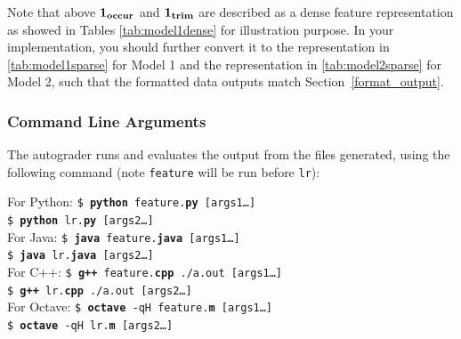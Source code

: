 \documentclass[11pt]{exam}
\numberwithin{equation}{section} %
\numberwithin{figure}{section} %
\numberwithin{table}{section} %
\begin{document}
Note that above $\bf{1}_{occur}$ and $\bf{1}_{trim}$ are described as a dense feature representation as showed in Tables \ref{tab:model1dense} for illustration purpose. In your implementation, you should further convert it to the representation in \ref{tab:model1sparse} for Model 1 and the representation in \ref{tab:model2sparse} for Model 2, such that the formatted data outputs match Section~\ref{format_output}.



\subsubsection{Command Line Arguments}
The autograder runs and evaluates the output from the files generated, using the following command (note \lstinline{feature} will be run before \lstinline{lr}):

\begin{tabbing}
For Python: \=\texttt{\$ \textbf{python} feature.\textbf{py} [args1\dots]}\\
\>\texttt{\$ \textbf{python} lr.\textbf{py} [args2\dots]}\\
For Java: \>\texttt{\$ \textbf{java} feature.\textbf{java} [args1\dots]}\\
\>\texttt{\$ \textbf{java} lr.\textbf{java} [args2\dots]}\\
For C++: \>\texttt{\$ \textbf{g++} feature.\textbf{cpp} ./a.out [args1\dots]}\\
\>\texttt{\$ \textbf{g++} lr.\textbf{cpp} ./a.out [args2\dots]}\\
For Octave: \>\texttt{\$ \textbf{octave} -qH feature.\textbf{m} [args1\dots]}\\
\>\texttt{\$ \textbf{octave} -qH lr.\textbf{m} [args2\dots]}
\end{tabbing}
\end{document}
